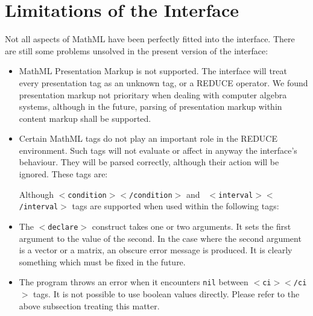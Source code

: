 \documentclass{article}
\begin{document}
\section{Limitations of the Interface}

Not all aspects of MathML have been perfectly fitted into the interface.
There are still some problems unsolved in the present version of the
interface:

\begin{itemize} 
\item MathML Presentation Markup is not supported. The
interface will treat every presentation tag as an unknown tag, or a REDUCE
operator. We found presentation markup not prioritary when dealing with
computer algebra systems, although in the future, parsing of presentation
markup within content markup shall be supported.  
\item Certain MathML tags
do not play an important role in the REDUCE environment. Such tags will not
evaluate or affect in anyway the interface's behaviour. They will be parsed
correctly, although their action will be ignored. These tags are: 

Although {\tt $<$condition$><$/condition$>$} and {\tt
$<$interval$><$/interval$>$} tags are supported when used within the
following tags:  
\item The {\tt $<$declare$>$} construct takes one or two arguments. It sets
the first argument to the value of the second. In the case where the second
argument is a vector or a matrix, an obscure error message is produced. It is
clearly something which must be fixed in the future.\\ \item The program
throws an error when it encounters {\tt nil} between {\tt $<$ci$><$/ci$>$}
tags. It is not possible to use boolean values directly.  Please refer to the
above subsection treating this matter.  
\end{itemize}
\end{document}
